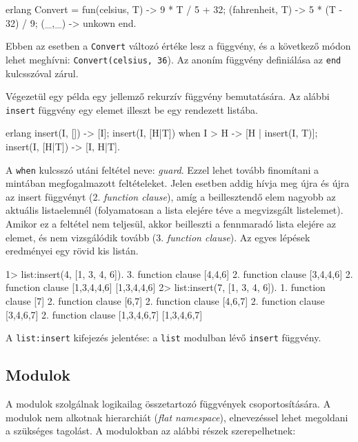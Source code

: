 \documentclass[12pt, a4paper, oneside]{book}
\begin{document}
\begin{code}{erlang}{}
Convert = fun(celsius, T) ->
                  9 * T / 5 + 32;
             (fahrenheit, T) ->
                  5 * (T - 32) / 9;
             (_,_) ->
                  unkown
          end.
\end{code}

Ebben az esetben a \texttt{Convert} változó értéke lesz a függvény, és a következő módon
lehet meghívni: \texttt{Convert(celsius, 36}). Az anoním függvény definiálása
az \texttt{end} kulcsszóval zárul.

Végezetül egy példa egy jellemző rekurzív függvény bemutatására. Az alábbi
\texttt{insert} függvény egy elemet illeszt be egy rendezett listába.

\begin{code}{erlang}{}
insert(I, []) ->
  [I];
insert(I, [H|T]) when I > H ->
  [H | insert(I, T)];
insert(I, [H|T]) ->
  [I, H|T].
\end{code}

\noindent A \texttt{when} kulcsszó utáni feltétel neve: \emph{guard}. Ezzel
lehet tovább finomítani a mintában megfogalmazott feltételeket. Jelen esetben
addig hívja meg újra és újra az insert függvényt (2. \emph{function clause}),
amíg a beillesztendő elem nagyobb az aktuális listaelemnél (folyamatosan a
lista elejére téve a megvizsgált listelemet). Amikor ez a feltétel nem
teljesül, akkor beilleszti a fennmaradó lista elejére az elemet, és nem
vizsgálódik tovább (3.  \emph{function clause}). Az egyes lépések eredményei
egy rövid kis listán.

\begin{code}{}{}
1> list:insert(4, [1, 3, 4, 6]).
3. function clause [4,4,6]
2. function clause [3,4,4,6]
2. function clause [1,3,4,4,6]
[1,3,4,4,6]
2> list:insert(7, [1, 3, 4, 6]).
1. function clause [7]
2. function clause [6,7]
2. function clause [4,6,7]
2. function clause [3,4,6,7]
2. function clause [1,3,4,6,7]
[1,3,4,6,7]
\end{code}

\noindent A \texttt{list:insert} kifejezés jelentése: a \texttt{list} modulban
lévő \texttt{insert} függvény. 

\subsection{Modulok} A modulok szolgálnak logikailag összetartozó függvények
csoportosítására. A modulok nem alkotnak hierarchiát (\emph{flat namespace}),
elnevezéssel lehet megoldani a szükséges tagolást. A modulokban az alábbi
részek szerepelhetnek:
\end{document}
